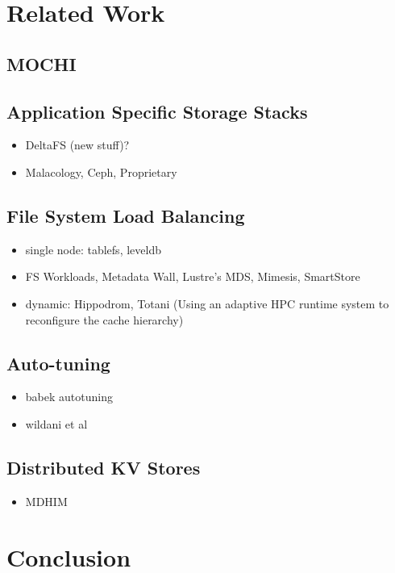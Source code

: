 \newpage
\section{Related Work}

\subsection{MOCHI}

\subsection{Application Specific Storage Stacks}

\begin{itemize}
  \item DeltaFS (new stuff)?
  \item Malacology, Ceph, Proprietary
\end{itemize}

\subsection{File System Load Balancing}

\begin{itemize}
  \item single node: tablefs, leveldb
  \item FS Workloads, Metadata Wall, Lustre’s MDS, Mimesis, SmartStore
  \item dynamic: Hippodrom, Totani (Using an adaptive HPC runtime system to reconfigure the cache hierarchy)
\end{itemize}

\subsection{Auto-tuning}

\begin{itemize}
  \item babek autotuning
  \item wildani et al
\end{itemize}


\subsection{Distributed KV Stores}

\begin{itemize}
  \item MDHIM
\end{itemize}




\section{Conclusion}
